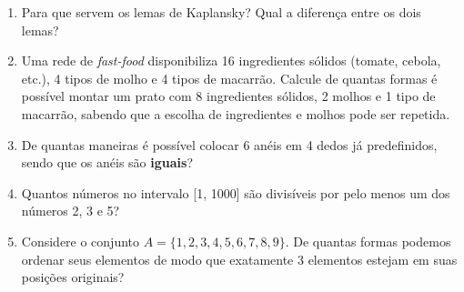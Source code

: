 \documentclass[a4paper,12pt]{letter}  %
\begin{document}
\begin{enumerate}
	\item Para que servem os lemas de Kaplansky? Qual a diferença entre os dois lemas?
	\item Uma rede de \textit{fast-food} disponibiliza 16 ingredientes sólidos (tomate, cebola, etc.), 4 tipos de molho e 4 tipos de macarrão. Calcule de quantas formas é possível montar um prato com 8 ingredientes sólidos, 2 molhos e 1 tipo de macarrão, sabendo que a escolha de ingredientes e molhos pode ser repetida.
	\item De quantas maneiras é possível colocar 6 anéis em 4 dedos já predefinidos, sendo que os anéis são \textbf{iguais}?

	\item Quantos números no intervalo [1, 1000] são divisíveis por pelo menos um dos números 2, 3 e 5?

	\item Considere o conjunto $A = \{1, 2, 3, 4, 5, 6, 7, 8, 9\}$. De quantas formas podemos ordenar seus elementos de modo que exatamente 3 elementos estejam em suas posições originais?


\end{enumerate}
\end{document}
